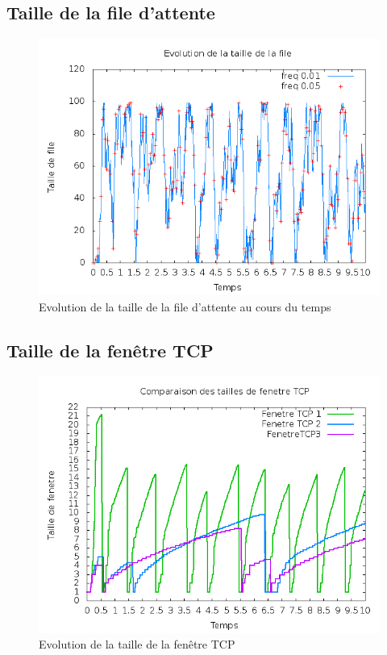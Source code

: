 \subsection{Taille de la file d'attente}

\begin{figure}[ht]
\includegraphics[scale=0.7]{../res/queuesize.png}
\caption{Evolution de la taille de la file d'attente au cours du temps}
\end{figure}

\subsection{Taille de la fenêtre TCP}
\begin{figure}[ht]
\includegraphics[scale=0.7]{../res/winsize.png}
\caption{Evolution de la taille de la fenêtre TCP}
\end{figure}


